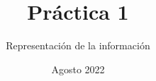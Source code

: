 
\setlength{\parindent}{0pt}

\title{Práctica 1}
\author{Representación de la información}
\date{Agosto 2022}



\maketitle













